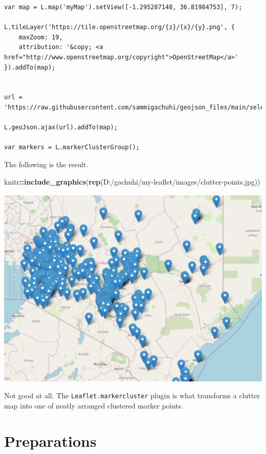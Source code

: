 \documentclass[
]{book}
\newenvironment{Shaded}{\begin{snugshade}}{\end{snugshade}}
\newcommand{\FunctionTok}[1]{\textcolor[rgb]{0.13,0.29,0.53}{\textbf{#1}}}
\newcommand{\NormalTok}[1]{#1}
\newcommand{\SpecialCharTok}[1]{\textcolor[rgb]{0.81,0.36,0.00}{\textbf{#1}}}
\newcommand{\StringTok}[1]{\textcolor[rgb]{0.31,0.60,0.02}{#1}}
\begin{document}
\begin{verbatim}
var map = L.map('myMap').setView([-1.295287148, 36.81984753], 7);

L.tileLayer('https://tile.openstreetmap.org/{z}/{x}/{y}.png', {
    maxZoom: 19,
    attribution: '&copy; <a href="http://www.openstreetmap.org/copyright">OpenStreetMap</a>'
}).addTo(map);


url = 'https://raw.githubusercontent.com/sammigachuhi/geojson_files/main/selected_hospitals.json'

L.geoJson.ajax(url).addTo(map);

var markers = L.markerClusterGroup();
\end{verbatim}

The following is the result.

\begin{Shaded}
\begin{Highlighting}[]
\NormalTok{knitr}\SpecialCharTok{::}\FunctionTok{include\_graphics}\NormalTok{(}\FunctionTok{rep}\NormalTok{(}\StringTok{\textquotesingle{}D:/gachuhi/my{-}leaflet/images/clutter{-}points.jpg\textquotesingle{}}\NormalTok{))}
\end{Highlighting}
\end{Shaded}

\includegraphics{../images/clutter-points.jpg}

Not good at all. The \texttt{Leaflet.markercluster} plugin is what transforms a clutter map into one of neatly arranged clustered marker points.

\hypertarget{preparations}{%
\section{Preparations}\label{preparations}}
\end{document}
